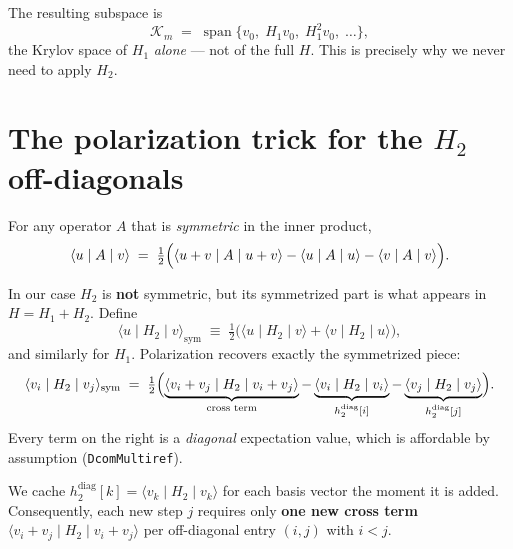 \documentclass[11pt]{article}
\begin{document}
The resulting subspace is
\begin{equation}
  \mathcal{K}_m \;=\;
  \operatorname{span}\{v_0,\; H_1 v_0,\; H_1^2 v_0,\; \dots\},
\end{equation}
the Krylov space of $H_1$ \emph{alone} --- not of the full $H$.
This is precisely why we never need to apply $H_2$.

\section{The polarization trick for the $H_2$ off-diagonals}

For any operator $A$ that is \emph{symmetric} in the inner product,
\begin{equation}
  \langle u \mid A \mid v \rangle
  \;=\;
  \tfrac{1}{2}\Bigl(
    \langle u+v \mid A \mid u+v \rangle
    - \langle u \mid A \mid u \rangle
    - \langle v \mid A \mid v \rangle
  \Bigr).
\end{equation}

In our case $H_2$ is \textbf{not} symmetric, but its symmetrized
part is what appears in $H = H_1 + H_2$.  Define
\begin{equation}
  \langle u \mid H_2 \mid v \rangle_{\mathrm{sym}}
  \;\equiv\;
  \tfrac{1}{2}\bigl(\langle u \mid H_2 \mid v \rangle
                   + \langle v \mid H_2 \mid u \rangle\bigr),
\end{equation}
and similarly for $H_1$.  Polarization recovers exactly the
symmetrized piece:
\begin{equation}
  \langle v_i \mid H_2 \mid v_j \rangle_{\mathrm{sym}}
  \;=\;
  \tfrac{1}{2}\Bigl(
    \underbrace{\langle v_i+v_j \mid H_2 \mid v_i+v_j \rangle}_{\text{cross term}}
    - \underbrace{\langle v_i \mid H_2 \mid v_i \rangle}_{h_2^{\mathrm{diag}}[i]}
    - \underbrace{\langle v_j \mid H_2 \mid v_j \rangle}_{h_2^{\mathrm{diag}}[j]}
  \Bigr).
\end{equation}
Every term on the right is a \emph{diagonal} expectation value, which
is affordable by assumption (\texttt{DcomMultiref}).

We cache $h_2^{\mathrm{diag}}[k] = \langle v_k \mid H_2 \mid v_k \rangle$
for each basis vector the moment it is added.  Consequently, each new
step $j$ requires only \textbf{one new cross term}
$\langle v_i+v_j \mid H_2 \mid v_i+v_j \rangle$ per off-diagonal
entry $(i,j)$ with $i < j$.
\end{document}
